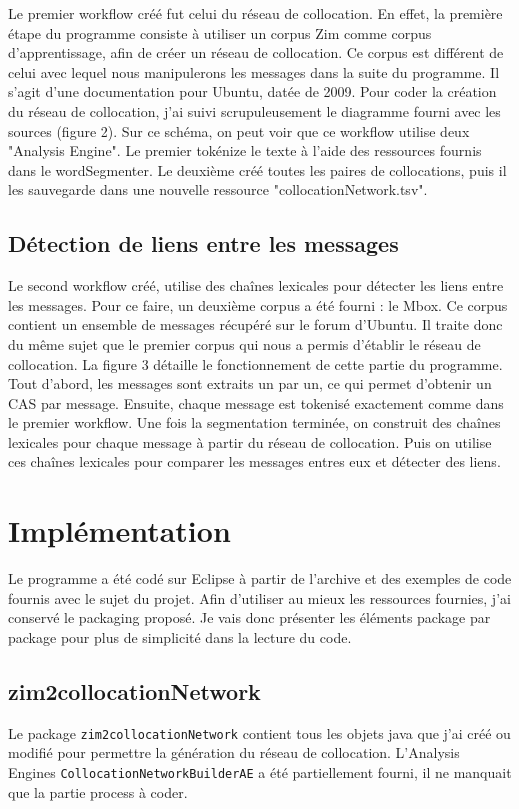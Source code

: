 \documentclass[a4paper]{article}
\begin{document}
	Le premier workflow créé fut celui du réseau de collocation. En effet, la première étape du programme consiste à utiliser un corpus Zim comme corpus d'apprentissage, afin de créer un réseau de collocation. Ce corpus est différent de celui avec lequel nous manipulerons les messages dans la suite du programme. Il s'agit d'une documentation pour Ubuntu, datée de 2009. Pour coder la création du réseau de collocation, j'ai suivi scrupuleusement le diagramme fourni avec les sources (figure 2). Sur ce schéma, on peut voir que ce workflow utilise deux "Analysis Engine". Le premier tokénize le texte à l'aide des ressources fournis dans le wordSegmenter. Le deuxième créé toutes les paires de collocations, puis il les sauvegarde dans une nouvelle ressource "collocationNetwork.tsv".

	\subsection{Détection de liens entre les messages}

	Le second workflow créé, utilise des chaînes lexicales pour détecter les liens entre les messages. Pour ce faire, un deuxième corpus a été fourni : le Mbox. Ce corpus contient un ensemble de messages récupéré sur le forum d'Ubuntu. Il traite donc du même sujet que le premier corpus qui nous a permis d’établir le réseau de collocation. La figure 3 détaille le fonctionnement de cette partie du programme. Tout d'abord, les messages sont extraits un par un, ce qui permet d'obtenir un CAS par message. Ensuite, chaque message est tokenisé exactement comme dans le premier workflow. Une fois la segmentation terminée, on construit des chaînes lexicales pour chaque message à partir du réseau de collocation. Puis on utilise ces chaînes lexicales pour comparer les messages entres eux et détecter des liens.
	
	\section{Implémentation}

Le programme a été codé sur Eclipse à partir de l'archive et des exemples de code fournis avec le sujet du projet. Afin d'utiliser au mieux les ressources fournies, j'ai conservé le packaging proposé. Je vais donc présenter les éléments package par package pour plus de simplicité dans la lecture du code. 

	\subsection{zim2collocationNetwork}
	Le package \texttt{zim2collocationNetwork} contient tous les objets java que j'ai créé ou modifié pour permettre la génération du réseau de collocation. L'Analysis Engines \texttt{CollocationNetworkBuilderAE} a été partiellement fourni, il ne manquait que la partie process à coder.
\end{document}

